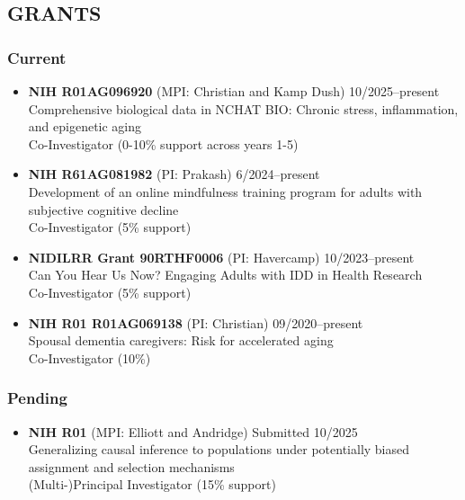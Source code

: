 \documentclass[
  english,
  letterpaper,
  DIV=11,
  numbers=noendperiod]{scrartcl}
\providecommand{\tightlist}{%
  \setlength{\itemsep}{0pt}\setlength{\parskip}{0pt}}
\begin{document}
\subsection{GRANTS}\label{grants}

\subsubsection{Current}\label{current}

\begin{itemize}
\tightlist
\item
  \textbf{NIH R01AG096920} (MPI: Christian and Kamp Dush)
  {10/2025--present}\\
  Comprehensive biological data in NCHAT BIO: Chronic stress,
  inflammation, and epigenetic aging\\
  Co-Investigator (0-10\% support across years 1-5)
\item
  \textbf{NIH R61AG081982} (PI: Prakash) {6/2024--present}\\
  Development of an online mindfulness training program for adults with
  subjective cognitive decline\\
  Co-Investigator (5\% support)
\item
  \textbf{NIDILRR Grant 90RTHF0006} (PI: Havercamp) {10/2023--present}\\
  Can You Hear Us Now? Engaging Adults with IDD in Health Research\\
  Co-Investigator (5\% support)
\item
  \textbf{NIH R01 R01AG069138} (PI: Christian) {09/2020--present}\\
  Spousal dementia caregivers: Risk for accelerated aging\\
  Co-Investigator (10\%)
\end{itemize}

\subsubsection{Pending}\label{pending}

\begin{itemize}
\tightlist
\item
  \textbf{NIH R01} (MPI: Elliott and Andridge) {Submitted 10/2025}\\
  Generalizing causal inference to populations under potentially biased
  assignment and selection mechanisms\\
  (Multi-)Principal Investigator (15\% support)
\end{itemize}
\end{document}
